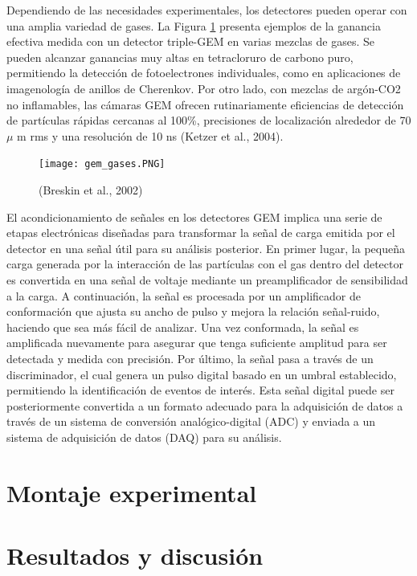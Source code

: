 \documentclass{article}
\begin{document}
\noindent Dependiendo de las necesidades experimentales, los detectores pueden operar con una amplia variedad de gases. La Figura \ref{fig:gem_gases} presenta ejemplos de la ganancia efectiva medida con un detector triple-GEM en varias mezclas de gases. Se pueden alcanzar ganancias muy altas en tetracloruro de carbono puro, permitiendo la detección de fotoelectrones individuales, como en aplicaciones de imagenología de anillos de Cherenkov. Por otro lado, con mezclas de argón-CO2 no inflamables, las cámaras GEM ofrecen rutinariamente eficiencias de detección de partículas rápidas cercanas al 100\%, precisiones de localización alrededor de 70 $\mu$ m rms y una resolución de 10 ns (Ketzer et al., 2004).

\begin{figure}[H]
    \centering
    \texttt{[image: gem\_gases.PNG]}
    \caption{(Breskin et al., 2002)}
    \label{fig:gem_gases}
\end{figure}

\noindent El acondicionamiento de señales en los detectores GEM implica una serie de etapas electrónicas diseñadas para transformar la señal de carga emitida por el detector en una señal útil para su análisis posterior. En primer lugar, la pequeña carga generada por la interacción de las partículas con el gas dentro del detector es convertida en una señal de voltaje mediante un preamplificador de sensibilidad a la carga. A continuación, la señal es procesada por un amplificador de conformación que ajusta su ancho de pulso y mejora la relación señal-ruido, haciendo que sea más fácil de analizar. Una vez conformada, la señal es amplificada nuevamente para asegurar que tenga suficiente amplitud para ser detectada y medida con precisión. Por último, la señal pasa a través de un discriminador, el cual genera un pulso digital basado en un umbral establecido, permitiendo la identificación de eventos de interés. Esta señal digital puede ser posteriormente convertida a un formato adecuado para la adquisición de datos a través de un sistema de conversión analógico-digital (ADC) y enviada a un sistema de adquisición de datos (DAQ) para su análisis.
\newpage

\section{Montaje experimental}
\newpage

\section{Resultados y discusión}
\newpage
\end{document}

